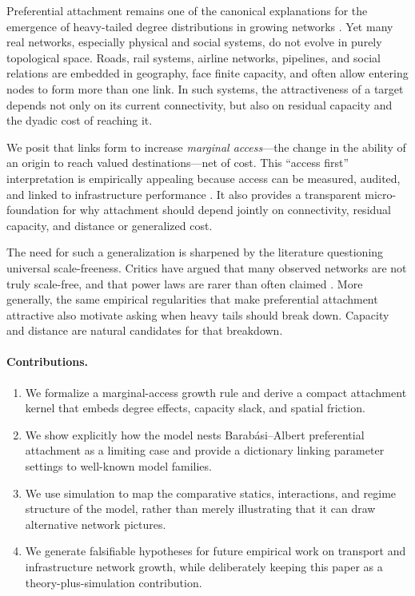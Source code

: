 \documentclass[11pt]{article}
\begin{document}
Preferential attachment remains one of the canonical explanations for the emergence of heavy-tailed degree distributions in growing networks \citep{barabasi1999emergence}. Yet many real networks, especially physical and social systems, do not evolve in purely topological space. Roads, rail systems, airline networks, pipelines, and social relations are embedded in geography, face finite capacity, and often allow entering nodes to form more than one link. In such systems, the attractiveness of a target depends not only on its current connectivity, but also on residual capacity and the dyadic cost of reaching it.

We posit that links form to increase \emph{marginal access}---the change in the ability of an origin to reach valued destinations---net of cost. This ``access first'' interpretation is empirically appealing because access can be measured, audited, and linked to infrastructure performance \citep{levinson2020towards,wu2020unifying,wang2022time}. It also provides a transparent micro-foundation for why attachment should depend jointly on connectivity, residual capacity, and distance or generalized cost.

The need for such a generalization is sharpened by the literature questioning universal scale-freeness. Critics have argued that many observed networks are not truly scale-free, and that power laws are rarer than often claimed \citep{holme2019rare,broido2019scale,clauset2009power,willinger2009mathematics}. More generally, the same empirical regularities that make preferential attachment attractive also motivate asking when heavy tails should break down. Capacity and distance are natural candidates for that breakdown.

\paragraph{Contributions.}
\begin{enumerate}[leftmargin=1.5em]
    \item We formalize a marginal-access growth rule and derive a compact attachment kernel that embeds degree effects, capacity slack, and spatial friction.
    \item We show explicitly how the model nests Barab\'asi--Albert preferential attachment as a limiting case and provide a dictionary linking parameter settings to well-known model families.
    \item We use simulation to map the comparative statics, interactions, and regime structure of the model, rather than merely illustrating that it can draw alternative network pictures.
    \item We generate falsifiable hypotheses for future empirical work on transport and infrastructure network growth, while deliberately keeping this paper as a theory-plus-simulation contribution.
\end{enumerate}
\end{document}
